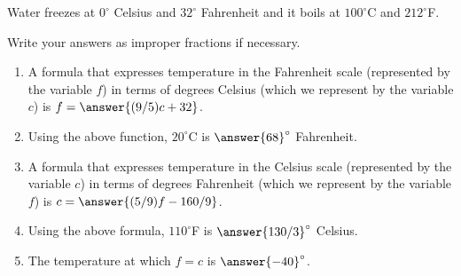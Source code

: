 \documentclass{ximera}
\author{Kenneth Berglund}
\begin{document}
\begin{exercise}
\licenseSZ

Water freezes at $0^\circ$ Celsius and $32^\circ$ Fahrenheit and it boils at $100^\circ$C and $212^\circ$F.

Write your answers as improper fractions if necessary. 

\begin{enumerate}
\item A formula that expresses temperature in the Fahrenheit scale (represented by the variable $f$) in terms of
degrees Celsius (which we represent by the variable $c$) is $f = \answer{(9/5)c + 32}$. 

\item Using the above function, $20^\circ$C is $\answer{68}^\circ$ Fahrenheit.

\item A formula that expresses temperature in the Celsius scale (represented by the variable $c$) in terms of
degrees Fahrenheit (which we represent by the variable $f$) is $c = \answer{(5/9)f - 160/9}$. 

\item Using the above formula, $110^\circ$F is $\answer{130/3}^\circ$ Celsius.

\item The temperature at which $f = c$ is $\answer{-40}^\circ$.

	
\end{enumerate}

\end{exercise}
\end{document}
